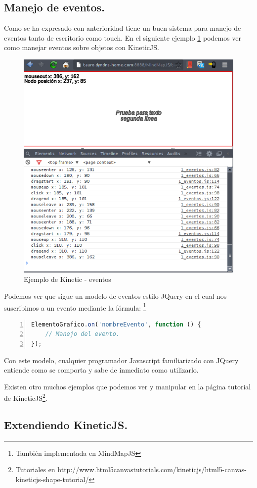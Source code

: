 \subsection{Manejo de eventos.}
Como se ha expresado con anterioridad tiene un buen sistema para manejo de eventos tanto de escritorio como touch. En el siguiente ejemplo \ref{fig:kinetic-ejemplo-eventos} podemos ver como manejar eventos sobre objetos con KineticJS.

\begin{figure}[tbph]
\centering
\includegraphics[width=0.6\linewidth]{imagenes/KineticjsEjemplo1.png}
\caption{Ejemplo de Kinetic - eventos}
\label{fig:kinetic-ejemplo-eventos}
\end{figure}



Podemos ver que sigue un modelo de eventos estilo JQuery en el cual nos suscribimos a un evento mediante la fórmula: \footnote{También implementada en MindMapJS} 
\begin{lstlisting}[language=JavaScript, numbers=left]
ElementoGrafico.on('nombreEvento', function () { 
	// Manejo del evento.
});
\end{lstlisting}

Con este modelo, cualquier programador Javascript familiarizado con JQuery entiende como se comporta y sabe de inmediato como utilizarlo.  

Existen otro muchos ejemplos que podemos ver y manipular en la página tutorial de KineticJS\footnote{Tutoriales en http://www.html5canvastutorials.com/kineticjs/html5-canvas-kineticjs-shape-tutorial/}. 

\subsection{Extendiendo KineticJS.}

